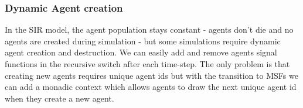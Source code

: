 \subsubsection{Dynamic Agent creation}
In the SIR model, the agent population stays constant - agents don't die and no agents are created during simulation - but some simulations \cite{epstein_growing_1996} require dynamic agent creation and destruction. We can easily add and remove agents signal functions in the recursive switch after each time-step. The only problem is that creating new agents requires unique agent ids but with the transition to MSFs we can add a monadic context which allows agents to draw the next unique agent id when they create a new agent. 